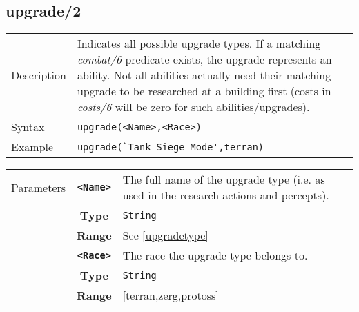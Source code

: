 \subsection{upgrade/2}
\begin{tabularx}{\textwidth}{lX}
 Description & Indicates all possible upgrade types. If a matching \textit{combat/6} predicate exists, the upgrade represents an ability. Not all abilities actually need their matching upgrade to be researched at a building first (costs in \textit{costs/6} will be zero for such abilities/upgrades). \\
 Syntax & \verb|upgrade(<Name>,<Race>)| \\
 Example & \verb|upgrade(`Tank Siege Mode',terran)| \\
 \end{tabularx}
 \begin{tabularx}{\textwidth}{l | c | p{8cm}|}
 \cline{2-3}
 Parameters & \textbf{\verb|<Name>|} & The full name of the upgrade type (i.e. as used in the research actions and percepts). \\
            & \textbf{Type} & \verb|String| \\
            & \textbf{Range} & See \ref{upgradetype} \\
            \cline{2-3}
 			& \textbf{\verb|<Race>|} & The race the upgrade type belongs to.\\
            & \textbf{Type} & \verb|String| \\
            & \textbf{Range} & [terran,zerg,protoss] \\
            \cline{2-3}
\end{tabularx}

